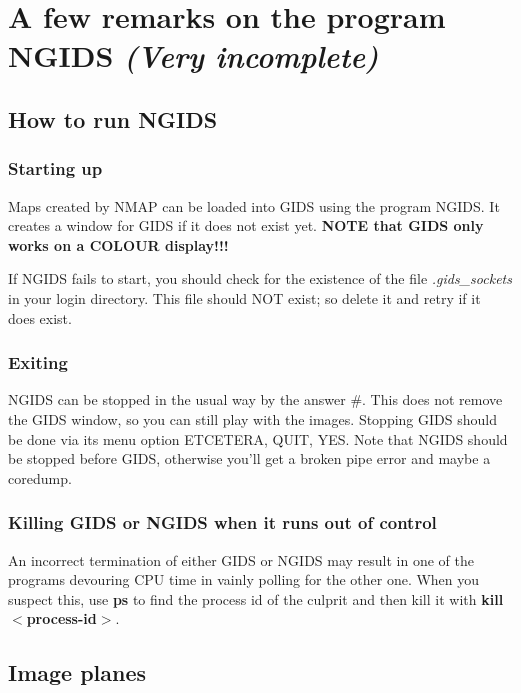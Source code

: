 %
%
%
%
\chapter{A few remarks on the program NGIDS {\it (Very incomplete)}}
\tableofcontents

\section{ How to run NGIDS}
\subsection{ Starting up}

	Maps created by NMAP can be loaded into GIDS using the program NGIDS.
It creates a window for GIDS if it does not exist yet. {\bf NOTE that GIDS only
works on a COLOUR display!!!}

	If NGIDS fails to start, you should check for the existence of the file
{\em .gids\_sockets} in your login directory. This file should NOT exist; so
delete it and retry if it does exist.


\subsection{ Exiting}

	NGIDS can be stopped in the usual way by the answer \#. This does not
remove the GIDS window, so you can still play with the images. Stopping GIDS
should be done via its menu option ETCETERA, QUIT, YES. Note that NGIDS should
be stopped before GIDS, otherwise you'll get a broken pipe error and maybe a
coredump.


\subsection{ Killing GIDS or NGIDS when it runs out of control}

	An incorrect termination of either GIDS or NGIDS may result in one of
the programs devouring CPU time in vainly polling for the other one. When you
suspect this, use {\bf ps} to find the process id of the culprit and then kill
it with {\bf kill $<$process-id$>$}.


\section{ Image planes}

